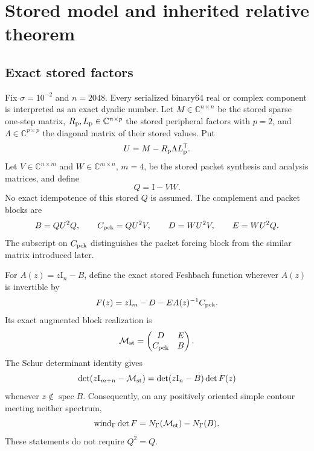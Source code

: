 \documentclass[11pt]{article}
\theoremstyle{definition}
\theoremstyle{remark}
\newcommand{\C}{\mathbb C}
\newcommand{\Id}{\mathrm I}
\newcommand{\wind}{\operatorname{wind}}
\newcommand{\spec}{\operatorname{spec}}
\newcommand{\Maug}{\mathcal M_{\rm st}}
\begin{document}
\section{Stored model and inherited relative theorem}
\label{sec:stored-model}

\subsection{Exact stored factors}

Fix \(\sigma=10^{-2}\) and \(n=2048\).  Every serialized binary64 real or
complex component is interpreted as an exact dyadic number.  Let
\(M\in\C^{n\times n}\) be the stored sparse one-step matrix,
\(R_{\rm p},L_{\rm p}\in\C^{n\times p}\) the stored peripheral factors with
\(p=2\), and \(\Lambda\in\C^{p\times p}\) the diagonal matrix of their
stored values.  Put
\begin{equation}
 U=M-R_{\rm p}\Lambda L_{\rm p}^{\mathsf T}.
 \label{eq:stored-u}
\end{equation}
Let \(V\in\C^{n\times m}\) and \(W\in\C^{m\times n}\), \(m=4\), be the
stored packet synthesis and analysis matrices, and define
\begin{equation}
 Q=\Id-VW.
 \label{eq:stored-q}
\end{equation}
No exact idempotence of this stored \(Q\) is assumed.  The complement and
packet blocks are
\begin{equation}
 B=QU^2Q,\qquad
 C_{\rm pck}=QU^2V,\qquad
 D=WU^2V,\qquad
 E=WU^2Q.
 \label{eq:stored-blocks}
\end{equation}
The subscript on \(C_{\rm pck}\) distinguishes the packet forcing block from
the similar matrix introduced later.

For \(A(z)=z\Id_n-B\), define the exact stored Feshbach function wherever
\(A(z)\) is invertible by
\begin{equation}
 F(z)=z\Id_m-D-EA(z)^{-1}C_{\rm pck}.
 \label{eq:stored-feshbach}
\end{equation}
Its exact augmented block realization is
\begin{equation}
 \Maug=
 \begin{pmatrix}
  D&E\\
  C_{\rm pck}&B
 \end{pmatrix}.
 \label{eq:stored-augmented}
\end{equation}
The Schur determinant identity gives
\begin{equation}
 \det(z\Id_{m+n}-\Maug)
 =\det(z\Id_n-B)\det F(z)
 \label{eq:schur-determinant-identity}
\end{equation}
whenever \(z\notin\spec B\).  Consequently, on any positively oriented
simple contour meeting neither spectrum,
\begin{equation}
 \wind_\Gamma\det F
 =N_\Gamma(\Maug)-N_\Gamma(B).
 \label{eq:relative-count}
\end{equation}
These statements do not require \(Q^2=Q\).
\end{document}
